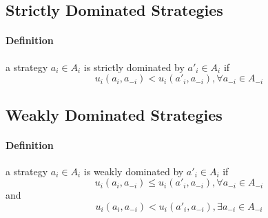 \subsection{Strictly Dominated Strategies}
\paragraph{Definition}a strategy $a_i \in A_i $ is strictly dominated by $a'_i \in A_i$ if
\begin{equation} u_i(a_i, a_{-i}) < u_i(a'_i, a_{-i}) ,  \forall   a_{-i} \in A_{-i} \end{equation}
\subsection{Weakly Dominated Strategies}
\paragraph{Definition}a strategy $a_i \in A_i $ is weakly dominated by $a'_i \in A_i$ if
\begin{equation} u_i(a_i, a_{-i}) \leq u_i(a'_i, a_{-i}) ,  \forall   a_{-i} \in A_{-i} \end{equation}
and \begin{equation} u_i(a_i, a_{-i}) < u_i(a'_i, a_{-i}) ,\exists   a_{-i} \in A_{-i} \end{equation} 
